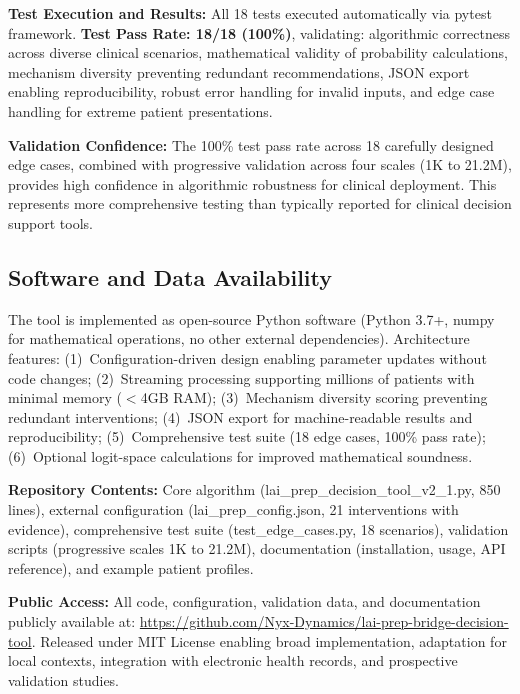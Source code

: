 \textbf{Test Execution and Results:} All 18 tests executed automatically via pytest framework. \textbf{Test Pass Rate: 18/18 (100\%)}, validating: algorithmic correctness across diverse clinical scenarios, mathematical validity of probability calculations, mechanism diversity preventing redundant recommendations, JSON export enabling reproducibility, robust error handling for invalid inputs, and edge case handling for extreme patient presentations.

\textbf{Validation Confidence:} The 100\% test pass rate across 18 carefully designed edge cases, combined with progressive validation across four scales (1K to 21.2M), provides high confidence in algorithmic robustness for clinical deployment. This represents more comprehensive testing than typically reported for clinical decision support tools.



\subsection{Software and Data Availability}

The tool is implemented as open-source Python software (Python 3.7+, numpy for mathematical operations, no other external dependencies). Architecture features: (1)~Configuration-driven design enabling parameter updates without code changes; (2)~Streaming processing supporting millions of patients with minimal memory ($<$4GB RAM); (3)~Mechanism diversity scoring preventing redundant interventions; (4)~JSON export for machine-readable results and reproducibility; (5)~Comprehensive test suite (18 edge cases, 100\% pass rate); (6)~Optional logit-space calculations for improved mathematical soundness.

\textbf{Repository Contents:} Core algorithm (lai\_prep\_decision\_tool\_v2\_1.py, 850 lines), external configuration (lai\_prep\_config.json, 21 interventions with evidence), comprehensive test suite (test\_edge\_cases.py, 18 scenarios), validation scripts (progressive scales 1K to 21.2M), documentation (installation, usage, API reference), and example patient profiles.

\textbf{Public Access:} All code, configuration, validation data, and documentation publicly available at: \url{https://github.com/Nyx-Dynamics/lai-prep-bridge-decision-tool}. Released under MIT License enabling broad implementation, adaptation for local contexts, integration with electronic health records, and prospective validation studies.

